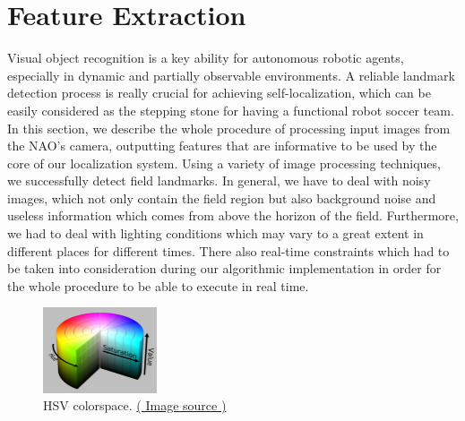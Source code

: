 \documentclass[	DIV=calc,%
							paper=a4,%
							fontsize=9pt,%
							twocolumn]{scrartcl}	 					%
\begin{document}
\section{Feature Extraction}
Visual object recognition is a key ability for autonomous robotic agents, especially in dynamic and partially observable environments. A reliable landmark detection process is really crucial for achieving self-localization, which can be easily considered as the stepping stone for having a functional robot soccer team. In this section, we describe the whole procedure of processing input images from the NAO's camera, outputting features that are informative to be used by the core of our localization system.  Using a variety of image processing techniques, we successfully detect field landmarks. In general, we have to deal with noisy images, which not only contain the field region but also background noise and useless information which comes from above the horizon of the field. Furthermore, we had to deal with lighting conditions which may vary to a great extent in different places for different times. There also real-time constraints which had to be taken into consideration during our algorithmic implementation in order for the whole procedure to be able to execute in real time.

\begin{figure}[t!]
  \caption{HSV colorspace. \href{http://en.wikipedia.org/wiki/HSL_and_HSV}{( Image source )}}
  \label{hsv}
  \centering
    \includegraphics[width=0.3\textwidth]{figures/1280px-HSV_color_solid_cylinder_alpha_lowgamma.png}
\end{figure}
\end{document}
